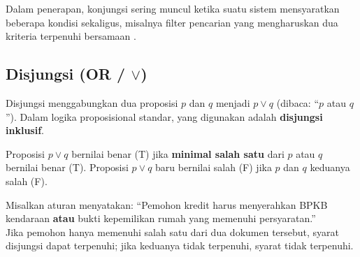 Dalam penerapan, konjungsi sering muncul ketika suatu sistem mensyaratkan beberapa kondisi sekaligus, misalnya filter pencarian yang mengharuskan dua kriteria terpenuhi bersamaan \cite{wiki_first_order_logic}.

\subsection{Disjungsi (OR / $\vee$)}

Disjungsi menggabungkan dua proposisi $p$ dan $q$ menjadi $p \vee q$ (dibaca: ``$p$ atau $q$''). Dalam logika proposisional standar, yang digunakan adalah \textbf{disjungsi inklusif}.

\begin{definisi}
Proposisi $p \vee q$ bernilai benar (T) jika \textbf{minimal salah satu} dari $p$ atau $q$ bernilai benar (T). Proposisi $p \vee q$ baru bernilai salah (F) jika $p$ dan $q$ keduanya salah (F).
\end{definisi}

\begin{contoh}
Misalkan aturan menyatakan: ``Pemohon kredit harus menyerahkan BPKB kendaraan \textbf{atau} bukti kepemilikan rumah yang memenuhi persyaratan.''\\
Jika pemohon hanya memenuhi salah satu dari dua dokumen tersebut, syarat disjungsi dapat terpenuhi; jika keduanya tidak terpenuhi, syarat tidak terpenuhi.
\end{contoh}
